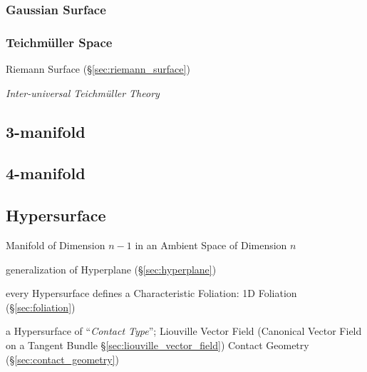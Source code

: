 \subsubsection{Gaussian Surface}\label{sec:gaussian_surface}\hfill

\subsubsection{Teichm\"uller Space}\label{sec:teichmuller_space}

Riemann Surface (\S\ref{sec:riemann_surface})

\emph{Inter-universal Teichm\"uller Theory} %



\subsection{3-manifold}\label{sec:three_manifold}

\subsection{4-manifold}\label{sec:four_manifold}

\subsection{Hypersurface}\label{sec:hypersurface}


Manifold of Dimension $n-1$ in an Ambient Space of Dimension $n$

generalization of Hyperplane (\S\ref{sec:hyperplane})

every Hypersurface defines a Characteristic Foliation: 1D Foliation
(\S\ref{sec:foliation})

a Hypersurface of ``\emph{Contact Type}''; Liouville Vector Field (Canonical
Vector Field on a Tangent Bundle \S\ref{sec:liouville_vector_field}) \fist
Contact Geometry (\S\ref{sec:contact_geometry})

